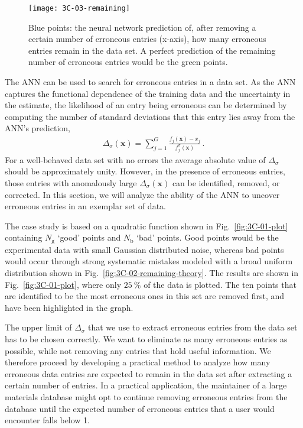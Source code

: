 \documentclass[review]{elsarticle}
\newcommand{\figref}[1]{Fig.~\ref{#1}}
\newcommand{\punc}[1]{\,#1}
\newcommand{\vx}{\textbf{x}}
\begin{document}
\begin{figure}
 \centering
 \texttt{[image: 3C-03-remaining]}
 \caption{Blue points: the neural network prediction of, after removing a
   certain number of erroneous entries (x-axis), how many erroneous entries
   remain in the data set. A perfect prediction of the remaining number of
   erroneous entries would be the green points.}
 \label{fig:3C-03-remaining}
\end{figure}

The ANN can be used to search for erroneous entries in a data set. As the
ANN captures the functional dependence of the training data and the
uncertainty in the estimate, the likelihood of an entry being erroneous
can be determined by computing the number of standard deviations that this
entry lies away from the ANN's prediction,
%
\begin{align}
 \Delta_\sigma(\vx)=\sum_{j=1}^G\frac{f_j(\vx)-x_j}{f^\sigma_j(\vx)}\punc{.}
\end{align}
%
For a well-behaved data set with no errors the average absolute value of
$\Delta_{\sigma}$ should be approximately unity. However, in the presence of
erroneous entries, those entries with anomalously large $\Delta_\sigma(\vx)$
can be identified, removed, or corrected. In this section, we will analyze
the ability of the ANN to uncover erroneous entries in an exemplar set of
data.

The case study is based on a quadratic function shown in
\figref{fig:3C-01-plot} containing $N_\textrm{g}$ `good' points and
$N_\textrm{b}$ `bad' points. Good points would be the experimental data with
small Gaussian distributed noise, whereas bad points would occur through
strong systematic mistakes modeled with a broad uniform distribution
shown in \figref{fig:3C-02-remaining-theory}. The
results are shown in \figref{fig:3C-01-plot}, where only $\SI{25}{\percent}$
of the data is plotted.  The ten points that are identified to be the most
erroneous ones in this set are removed first, and have been highlighted
in the graph.

The upper limit of $\Delta_\sigma$ that we use to extract erroneous entries
from the data set has to be chosen correctly. We want to eliminate as many
erroneous entries as possible, while not removing any entries that hold
useful information.  We therefore proceed by developing a practical method
to analyze how many erroneous data entries are expected to remain in the
data set after extracting a certain number of entries. In a practical
application, the maintainer of a large materials database might opt to
continue removing erroneous entries from the database until the expected
number of erroneous entries that a user would encounter falls below 1.
\end{document}
